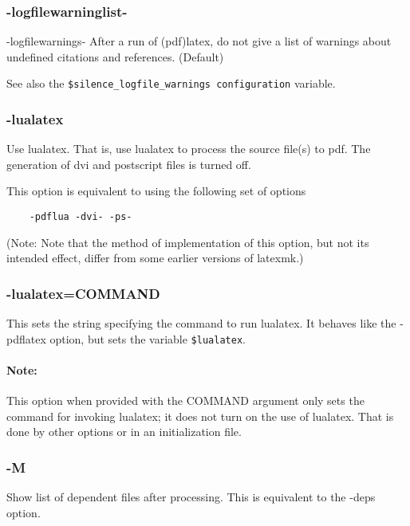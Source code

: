 \subsubsection{-logfilewarninglist-}

-logfilewarnings-  After a run of (pdf)latex, do not give a list
of warnings about undefined citations and references.  (Default)

See also the \verb|$silence_logfile_warnings configuration| variable.


\subsubsection{-lualatex}

Use lualatex.  That is,  use  lualatex  to  process  the  source
file(s)  to  pdf.  The generation of dvi and postscript files is
turned off.

This option is equivalent to using the following set of options

\begin{verbatim}
	-pdflua -dvi- -ps-
\end{verbatim}

(Note: Note that the method of implementation  of  this  option,
but  not  its intended effect, differ from some earlier versions
of latexmk.)


\subsubsection{-lualatex=COMMAND}

This sets the string specifying the command to run lualatex.  It
behaves like the -pdflatex option, but sets the variable
\verb|$lualatex|.

\paragraph{Note:}

This option when provided with the COMMAND  argument  only sets  the command
for invoking lualatex; it does not turn on the use of lualatex. That is done by
other options or in an initialization file.

\subsubsection{-M}

Show  list of dependent files after processing.  This is equivalent to
the -deps option.


